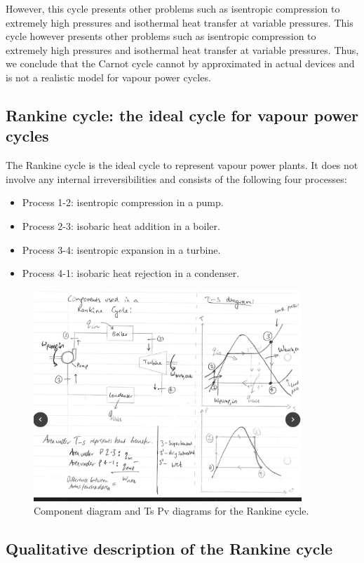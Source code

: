 \documentclass[class=report, crop=false, 12pt,a4paper]{standalone}
\begin{document}
However, this cycle presents other problems such as isentropic compression to extremely high pressures and isothermal heat transfer at variable pressures. This cycle however presents other problems such as isentropic compression to extremely high pressures and isothermal heat transfer at variable pressures. Thus, we conclude that the Carnot cycle cannot by approximated in actual devices and is not a realistic model for vapour power cycles. 
\subsection{Rankine cycle: the ideal cycle for vapour power cycles}
The Rankine cycle is the ideal cycle to represent vapour power plants. It does not involve any internal irreversibilities and consists of the following four processes:
\begin{itemize}[noitemsep]
  \item Process 1-2: isentropic compression in a pump.
  \item Process 2-3: isobaric heat addition in a boiler.
  \item Process 3-4: isentropic expansion in a turbine.
  \item Process 4-1: isobaric heat rejection in a condenser.
\end{itemize}
\begin{figure}
  \centering
  \includegraphics[width = 0.9\textwidth]{../img/RankineCycle}
  \caption{Component diagram and Ts Pv diagrams for the Rankine cycle.}
\end{figure}
\subsection{Qualitative description of the Rankine cycle}
\end{document}
